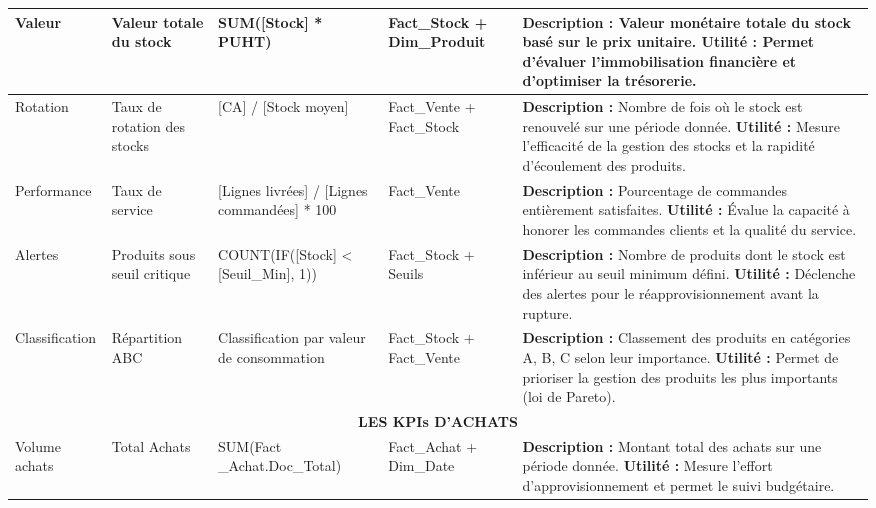{\begin{longtable}{|p{2cm}|p{1.8cm}|p{2.8cm}|p{2.2cm}|p{6cm}|}
Valeur & Valeur totale du stock & SUM([Stock] * PUHT) & Fact\_Stock + Dim\_Produit & \textbf{Description :} Valeur monétaire totale du stock basé sur le prix unitaire. \newline \textbf{Utilité :} Permet d'évaluer l'immobilisation financière et d'optimiser la trésorerie. \\
\hline

Rotation & Taux de rotation des stocks & [CA] / [Stock moyen] & Fact\_Vente + Fact\_Stock & \textbf{Description :} Nombre de fois où le stock est renouvelé sur une période donnée. \newline \textbf{Utilité :} Mesure l'efficacité de la gestion des stocks et la rapidité d'écoulement des produits. \\
\hline

Performance & Taux de service & [Lignes livrées] / [Lignes commandées] * 100 & Fact\_Vente & \textbf{Description :} Pourcentage de commandes entièrement satisfaites. \newline \textbf{Utilité :} Évalue la capacité à honorer les commandes clients et la qualité du service. \\
\hline

Alertes & Produits sous seuil critique & COUNT(IF([Stock] < [Seuil\_Min], 1)) & Fact\_Stock + Seuils & \textbf{Description :} Nombre de produits dont le stock est inférieur au seuil minimum défini. \newline \textbf{Utilité :} Déclenche des alertes pour le réapprovisionnement avant la rupture. \\
\hline

Classification & Répartition ABC & Classification par valeur de consommation & Fact\_Stock + Fact\_Vente & \textbf{Description :} Classement des produits en catégories A, B, C selon leur importance. \newline \textbf{Utilité :} Permet de prioriser la gestion des produits les plus importants (loi de Pareto). \\
\hline


\multicolumn{5}{|c|}{\cellcolor{gray!25}\textbf{LES KPIs D'ACHATS}} \\
\hline

Volume achats & Total Achats & SUM(Fact \_Achat.Doc\_Total) & Fact\_Achat + Dim\_Date & \textbf{Description :} Montant total des achats sur une période donnée. \newline \textbf{Utilité :} Mesure l'effort d'approvisionnement et permet le suivi budgétaire. \\
\hline


\end{longtable}}
